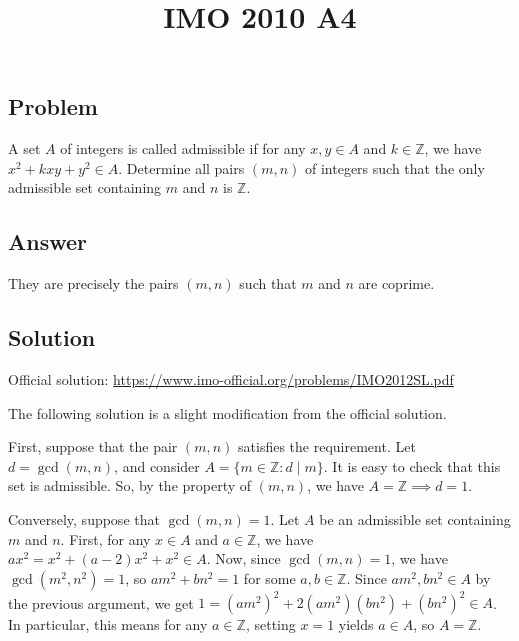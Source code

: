 \documentclass{article}
\title{IMO 2010 A4}
\author{}
\date{}
\newcommand{\Z}{\mathbb{Z}}
\begin{document}
\maketitle



\subsection*{Problem}

A set $A$ of integers is called admissible if for any $x, y \in A$ and $k \in \Z$, we have $x^2 + kxy + y^2 \in A$.
Determine all pairs $(m, n)$ of integers such that the only admissible set containing $m$ and $n$ is $\Z$.



\subsection*{Answer}

They are precisely the pairs $(m, n)$ such that $m$ and $n$ are coprime.



\subsection*{Solution}

Official solution: \url{https://www.imo-official.org/problems/IMO2012SL.pdf}

The following solution is a slight modification from the official solution.

First, suppose that the pair $(m, n)$ satisfies the requirement.
Let $d = \gcd(m, n)$, and consider $A = \{m \in \Z : d \mid m\}$.
It is easy to check that this set is admissible.
So, by the property of $(m, n)$, we have $A = \Z \implies d = 1$.

Conversely, suppose that $\gcd(m, n) = 1$.
Let $A$ be an admissible set containing $m$ and $n$.
First, for any $x \in A$ and $a \in \Z$, we have $ax^2 = x^2 + (a - 2) x^2 + x^2 \in A$.
Now, since $\gcd(m, n) = 1$, we have $\gcd(m^2, n^2) = 1$, so $am^2 + bn^2 = 1$ for some $a, b \in \Z$.
Since $am^2, bn^2 \in A$ by the previous argument, we get $1 = (am^2)^2 + 2(am^2)(bn^2) + (bn^2)^2 \in A$.
In particular, this means for any $a \in \Z$, setting $x = 1$ yields $a \in A$, so $A = \Z$.
\end{document}
